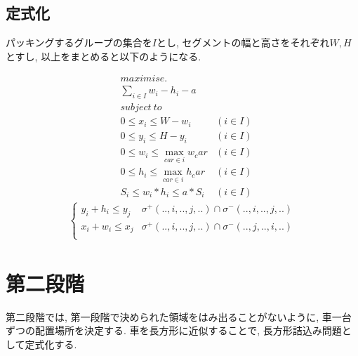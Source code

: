 \subsection{定式化}
パッキングするグループの集合を$I$とし, セグメントの幅と高さをそれぞれ$W, H$とすし, 以上をまとめると以下のようになる. \\
\begin{center}
    \begin{align}
        & maximise. \nonumber \\
        & \sum_{i \in I} w_i - h_i - a \\
        & subject\  to \nonumber \\
        & 0 \leq x_i \leq W - w_i & (i \in I) \\
        & 0 \leq y_i \leq H - y_i & (i \in I) \\
        & 0 \leq w_i \leq \max_{car \in i}w_car & (i \in I) \\
        & 0 \leq h_i \leq \max_{car \in i}h_car & (i \in I) \\
        & S_i \leq w_i*h_i \leq a*S_i &(i \in I)
    \end{align}
    \begin{eqnarray}
        \left\{
            \begin{array}{ll}
                y_i + h_i \leq y_j & \sigma^+(..,i,..,j,..) \cap \sigma^-(..,i,..,j,..) \\
                x_i + w_i \leq x_j & \sigma^+(..,i,..,j,..) \cap \sigma^-(..,j,..,i,..) \\
            \end{array}
        \right.
    \end{eqnarray}
\end{center}

\section{第二段階}
第二段階では, 第一段階で決められた領域をはみ出ることがないように, 車一台ずつの配置場所を決定する. 
車を長方形に近似することで, 長方形詰込み問題として定式化する. 

